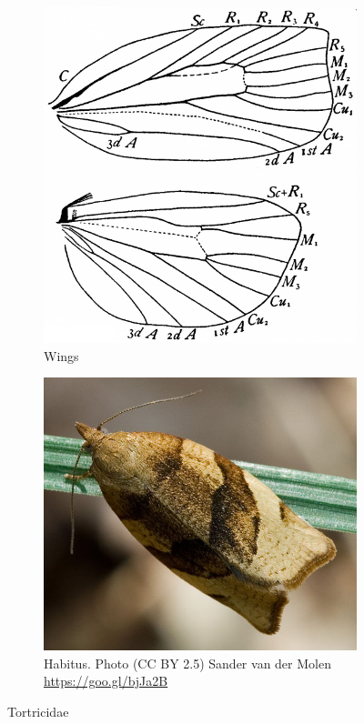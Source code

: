 \documentclass[letterpaper, 11pt]{article}
\begin{document}
\begin{figure}[ht!]
    \centering
    \begin{subfigure}[ht!]{0.35\textwidth}
        \includegraphics[width=\textwidth]{TortricidWings}
        \caption{Wings \citep[Fig. 353]{comstock1918wings}}
        \label{fig:tortricid1}
    \end{subfigure}
    \hfill %
    \begin{subfigure}[ht!]{0.40\textwidth}
        \includegraphics[width=\textwidth]{TortricidHabitus}
        \caption{Habitus. Photo (CC BY 2.5) Sander van der Molen \url{https://goo.gl/bjJa2B}}
        \label{fig:tortricid2}
    \end{subfigure}
    \caption{Tortricidae}\label{fig:tortricids}
\end{figure}
\end{document}
